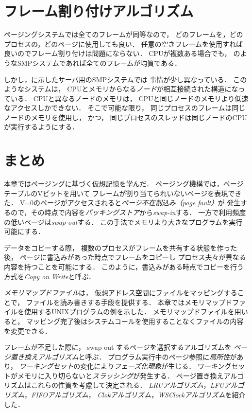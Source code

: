 \section{フレーム割り付けアルゴリズム}\label{frameAllocation}
ページングシステムでは全てのフレームが同等なので，
どのフレームを，どのプロセスの，どのページに使用しても良い．
任意の空きフレームを使用すれば良いのでフレーム割り付けは問題にならない．
CPUが複数ある場合でも，
のようなSMPシステムであれば全てのフレームが均質である．

しかし，に示したサーバ用のSMPシステムでは
事情が少し異なっている．
このようなシステムは，
CPUとメモリからなる\emph{ノード}が相互接続された構造になっている．
CPUと異なるノードのメモリは，
CPUと同じノードのメモリより低速なアクセスしかできない．
そこで可能な限り，
同じプロセスのフレームは同じノードのメモリを使用し，
かつ，
同じプロセスのスレッドは同じノードのCPUが実行するようにする．

\section{まとめ}
本章ではページングに基づく仮想記憶を学んだ．
ページング機構では，ページテーブルのVビットを用いて
フレームが割り当てられいないページを表現できた．
V=0のページがアクセスされると\emph{ページ不在割込み（page fault）}が
発生するので，その時点で内容を\emph{バッキングストア}から\emph{swap-in}する．
一方で利用頻度の低いページは\emph{swap-out}する．
この手法でメモリより大きなプログラムを実行可能にする．

データをコピーする際，
複数のプロセスがフレームを共有する状態を作った後，
ページに書込みがあった時点でフレームをコピーし
プロセス夫々が異なる内容を持つことを可能にする．
このように，書込みがある時点でコピーを行う方式を\emph{Copy on Write}と呼ぶ．

\emph{メモリマップドファイル}は，
仮想アドレス空間にファイルをマッピングすることで，
ファイルを読み書きする手段を提供する．
本章ではメモリマップドファイルを使用するUNIXプログラムの例を示した．
メモリマップドファイルを用いると，
マッピング完了後はシステムコールを使用することなくファイルの内容を変更できる．

フレームが不足した際に，
swap-out するページを選択するアルゴリズムを
\emph{ページ置き換えアルゴリズム}と呼ぶ．
プログラム実行中のページ参照に\emph{局所性}があり，
\emph{ワーキングセット}の変化により\emph{フェーズ化現象}が生じる．
ワーキングセットがメモリに入り切らないと\emph{スラッシング}が発生する．
ページ置き換えアルゴリズムはこれらの性質を考慮して決定される．
\emph{LRUアルゴリズム}，\emph{LFUアルゴリズム}，\emph{FIFOアルゴリズム}，
\emph{Clokアルゴリズム}，\emph{WSClockアルゴリズム}を紹介した．

